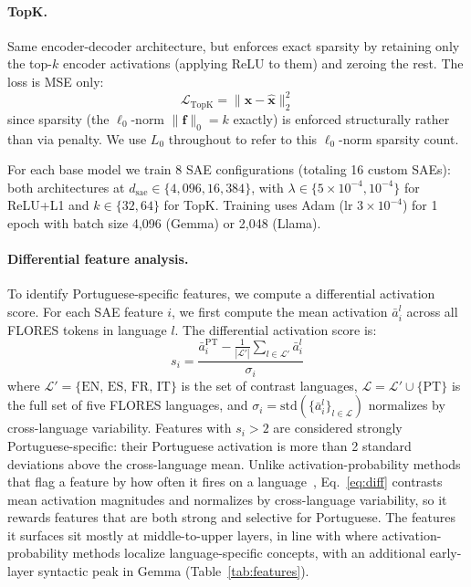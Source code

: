 \documentclass[runningheads]{llncs}
\begin{document}
\paragraph{TopK.} Same encoder-decoder architecture, but enforces exact sparsity by retaining only the top-$k$ encoder activations (applying ReLU to them) and zeroing the rest. The loss is MSE only:
\begin{equation}
\mathcal{L}_{\text{TopK}} = \|\mathbf{x} - \hat{\mathbf{x}}\|_2^2
\label{eq:topk_loss}
\end{equation}
since sparsity (the $\ell_0$-norm $\|\mathbf{f}\|_0 = k$ exactly) is enforced structurally rather than via penalty. We use $L_0$ throughout to refer to this $\ell_0$-norm sparsity count.

For each base model we train 8 SAE configurations (totaling 16 custom SAEs): both architectures at $d_\text{sae}\in\{4{,}096, 16{,}384\}$, with $\lambda\in\{5\times 10^{-4}, 10^{-4}\}$ for ReLU+L1 and $k\in\{32, 64\}$ for TopK. Training uses Adam (lr $3 \times 10^{-4}$) for 1 epoch with batch size 4,096 (Gemma) or 2,048 (Llama).

\paragraph{Differential feature analysis.}
\label{sec:differential}

To identify Portuguese-specific features, we compute a differential activation score. For each SAE feature $i$, we first compute the mean activation $\bar{a}_i^{l}$ across all FLORES tokens in language $l$. The differential activation score is:
\begin{equation}
s_i = \frac{\bar{a}_i^{\text{PT}} - \frac{1}{|\mathcal{L}'|}\sum_{l \in \mathcal{L}'}\bar{a}_i^{l}}{\sigma_i}
\label{eq:diff}
\end{equation}
where $\mathcal{L}' = \{\text{EN, ES, FR, IT}\}$ is the set of contrast languages, $\mathcal{L} = \mathcal{L}' \cup \{\text{PT}\}$ is the full set of five FLORES languages, and $\sigma_i = \text{std}(\{\bar{a}_i^{l}\}_{l \in \mathcal{L}})$ normalizes by cross-language variability. Features with $s_i > 2$ are considered strongly Portuguese-specific: their Portuguese activation is more than 2 standard deviations above the cross-language mean. Unlike activation-probability methods that flag a feature by how often it fires on a language~\cite{andrylie2025saelape}, Eq.~\ref{eq:diff} contrasts mean activation magnitudes and normalizes by cross-language variability, so it rewards features that are both strong and selective for Portuguese. The features it surfaces sit mostly at middle-to-upper layers, in line with where activation-probability methods localize language-specific concepts, with an additional early-layer syntactic peak in Gemma (Table~\ref{tab:features}).
\end{document}
